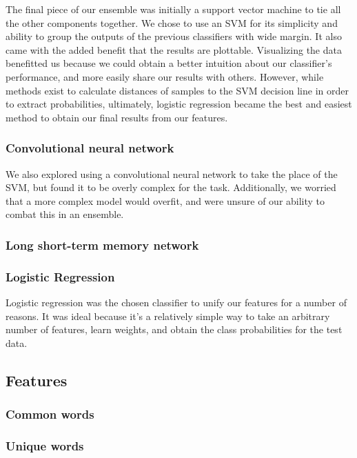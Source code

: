 \documentclass{article}
\begin{document}
The final piece of our ensemble was initially a support vector machine to tie all the other
components together. We chose to use an SVM for its simplicity and ability to
group the outputs of the previous classifiers with wide margin. It also came with the added benefit that the results are plottable. Visualizing the data benefitted us because we could obtain a better intuition about our classifier's performance, and more easily share our results with others. However, while methods exist to calculate distances of samples to the SVM decision line in order to extract probabilities, ultimately,  logistic regression became the best and easiest method to obtain our final results from our features. 

\subsubsection{Convolutional neural network}

We also explored using a convolutional neural network to take the place of the
SVM, but found it to be overly complex for the task. Additionally, we worried
that a more complex model would overfit, and were unsure of our ability to
combat this in an ensemble.

\subsubsection{Long short-term memory network}

\subsubsection{Logistic Regression}

Logistic regression was the chosen classifier to unify our features for a number of reasons. It was ideal because it's a relatively simple way to take an arbitrary number of features, learn weights, and obtain the class probabilities for the test data. 

\subsection{Features}

\subsubsection{Common words}

\subsubsection{Unique words}
\end{document}
